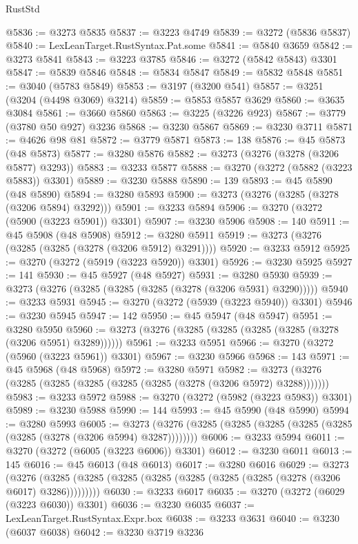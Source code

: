 \begin{lexlean}{RustStd}
\begin{coremodule}
{\begin{coremodule}
{{{{{{{{{{{{{{{{{{{{{{{{{{{{{{{{{{{{{@5836 := @3273 @5835
@5837 := @3223 @4749
@5839 := @3272 (@5836 @5837)
@5840 := LexLeanTarget.RustSyntax.Pat.some
@5841 := @5840 @3659
@5842 := @3273 @5841
@5843 := @3223 @3785
@5846 := @3272 (@5842 @5843) @3301
@5847 := @5839 @5846
@5848 := @5834 @5847
@5849 := @5832 @5848
@5851 := @3040 (@5783 @5849)
@5853 := @3197 (@3200 @541)
@5857 := @3251 (@3204 (@4498 @3069) @3214)
@5859 := @5853 @5857 @3629
@5860 := @3635 @3084
@5861 := @3660 @5860
@5863 := @3225 (@3226 @923)
@5867 := @3779 (@3780 @50 @927) @3236
@5868 := @3230 @5867
@5869 := @3230 @3711
@5871 := @4626 @98 @81
@5872 := @3779 @5871
@5873 := 138
@5876 := @45 @5873 (@48 @5873)
@5877 := @3280 @5876
@5882 := @3273 (@3276 (@3278 (@3206 @5877) @3293))
@5883 := @3233 @5877
@5888 := @3270 (@3272 (@5882 (@3223 @5883)) @3301)
@5889 := @3230 @5888
@5890 := 139
@5893 := @45 @5890 (@48 @5890)
@5894 := @3280 @5893
@5900 := @3273 (@3276 (@3285 (@3278 (@3206 @5894) @3292)))
@5901 := @3233 @5894
@5906 := @3270 (@3272 (@5900 (@3223 @5901)) @3301)
@5907 := @3230 @5906
@5908 := 140
@5911 := @45 @5908 (@48 @5908)
@5912 := @3280 @5911
@5919 := @3273 (@3276 (@3285 (@3285 (@3278 (@3206 @5912) @3291))))
@5920 := @3233 @5912
@5925 := @3270 (@3272 (@5919 (@3223 @5920)) @3301)
@5926 := @3230 @5925
@5927 := 141
@5930 := @45 @5927 (@48 @5927)
@5931 := @3280 @5930
@5939 := @3273 (@3276 (@3285 (@3285 (@3285 (@3278 (@3206 @5931) @3290)))))
@5940 := @3233 @5931
@5945 := @3270 (@3272 (@5939 (@3223 @5940)) @3301)
@5946 := @3230 @5945
@5947 := 142
@5950 := @45 @5947 (@48 @5947)
@5951 := @3280 @5950
@5960 := @3273 (@3276 (@3285 (@3285 (@3285 (@3285 (@3278 (@3206 @5951) @3289))))))
@5961 := @3233 @5951
@5966 := @3270 (@3272 (@5960 (@3223 @5961)) @3301)
@5967 := @3230 @5966
@5968 := 143
@5971 := @45 @5968 (@48 @5968)
@5972 := @3280 @5971
@5982 := @3273 (@3276 (@3285 (@3285 (@3285 (@3285 (@3285 (@3278 (@3206 @5972) @3288)))))))
@5983 := @3233 @5972
@5988 := @3270 (@3272 (@5982 (@3223 @5983)) @3301)
@5989 := @3230 @5988
@5990 := 144
@5993 := @45 @5990 (@48 @5990)
@5994 := @3280 @5993
@6005 := @3273 (@3276 (@3285 (@3285 (@3285 (@3285 (@3285 (@3285 (@3278 (@3206 @5994) @3287))))))))
@6006 := @3233 @5994
@6011 := @3270 (@3272 (@6005 (@3223 @6006)) @3301)
@6012 := @3230 @6011
@6013 := 145
@6016 := @45 @6013 (@48 @6013)
@6017 := @3280 @6016
@6029 := @3273
    (@3276 (@3285 (@3285 (@3285 (@3285 (@3285 (@3285 (@3285 (@3278 (@3206 @6017) @3286)))))))))
@6030 := @3233 @6017
@6035 := @3270 (@3272 (@6029 (@3223 @6030)) @3301)
@6036 := @3230 @6035
@6037 := LexLeanTarget.RustSyntax.Expr.box
@6038 := @3233 @3631
@6040 := @3230 (@6037 @6038)
@6042 := @3230 @3719 @3236
}}}}}}}}}}}}}}}}}}}}}}}}}}}}}}}}}}}}}
\end{coremodule}}
\end{coremodule}
\end{lexlean}
